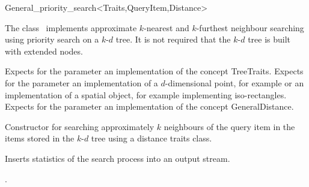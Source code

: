

\begin{ccRefClass}{General_priority_search<Traits,QueryItem,Distance>}  %


\ccDefinition

The class \ccRefName\ implements approximate $k$-nearest and $k$-furthest neighbour searching
using priority search on a $k$-$d$ tree. It is not required that the $k$-$d$ tree is
built with extended nodes.



\ccParameters

Expects for the parameter  an implementation of the concept TreeTraits.
Expects for the parameter   an implementation  
of a $d$-dimensional point, for example 
or an implementation of a spatial object, for
example  implementing iso-rectangles.
Expects for the parameter  an implementation of the
concept GeneralDistance.

\ccTypes



\ccCreation
{}  %

{Constructor for searching approximately $k$ neighbours of the query item 
in the items stored in the $k$-$d$ tree  using a distance
traits class.}




{
Inserts statistics of the search process into an output stream.
}


\ccSeeAlso

.


\end{ccRefClass}


